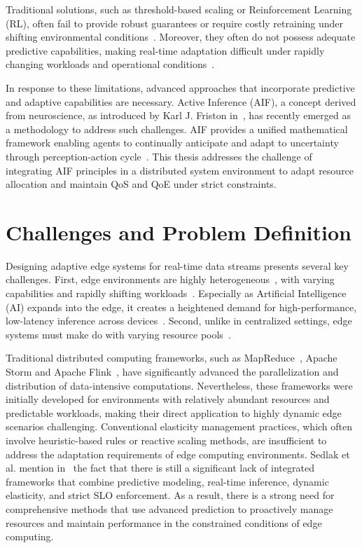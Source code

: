 Traditional solutions, such as threshold-based scaling or Reinforcement Learning (RL), often fail to provide robust guarantees or require costly retraining under shifting environmental conditions~\cite{xu_coscal_2022}. Moreover, they often do not possess adequate predictive capabilities, making real-time adaptation difficult under rapidly changing workloads and operational conditions~\cite{oquinn_environment-aware_2025}.

In response to these limitations, advanced approaches that incorporate predictive and adaptive
capabilities are necessary. Active Inference (AIF), a concept derived from neuroscience, as introduced by Karl J. Friston in~\cite{friston_free-energy_2010}, has recently emerged as a methodology to address such challenges. AIF provides a unified mathematical framework enabling agents to
continually anticipate and adapt to uncertainty through perception-action cycle~\cite{friston_active_2016, lanillos_active_2021}. This thesis addresses the challenge of integrating AIF principles in a distributed system environment to adapt resource allocation and maintain QoS and QoE under strict constraints.

\section{Challenges and Problem Definition}
Designing adaptive edge systems for real-time data streams presents several key
challenges. First, edge environments are highly heterogeneous~\cite{furst_elastic_2018}, with varying capabilities and
rapidly shifting workloads~\cite{danilenka_adaptive_2025}. Especially as Artificial Intelligence (AI) expands into the edge, it creates a heightened demand for high-performance, low-latency inference across devices~\cite{oquinn_environment-aware_2025}. Second, unlike in centralized settings, edge systems must make do with varying resource pools~\cite{sedlak_equilibrium_2024}.

Traditional distributed computing frameworks, such as MapReduce~\cite{dean_mapreduce_2008},
Apache Storm\cite{noauthor_apache_nodate} and Apache Flink~\cite{noauthor_apache_nodate-1, carbone_apache_2015}, have significantly advanced the parallelization and
distribution of data-intensive computations. Nevertheless, these frameworks were initially
developed for environments with relatively abundant resources and predictable workloads,
making their direct application to highly dynamic edge scenarios challenging. Conventional elasticity management practices, which often involve heuristic-based rules or reactive scaling methods, are insufficient to address the adaptation requirements of edge computing environments. Sedlak et al. mention in~\cite{sedlak_diffusing_2024} the fact that there is still a significant lack of integrated frameworks that combine predictive modeling, real-time inference, dynamic elasticity, and strict SLO enforcement. As a result, there is a strong need for comprehensive methods that use advanced prediction to proactively manage resources and maintain performance in the constrained conditions of edge computing.

